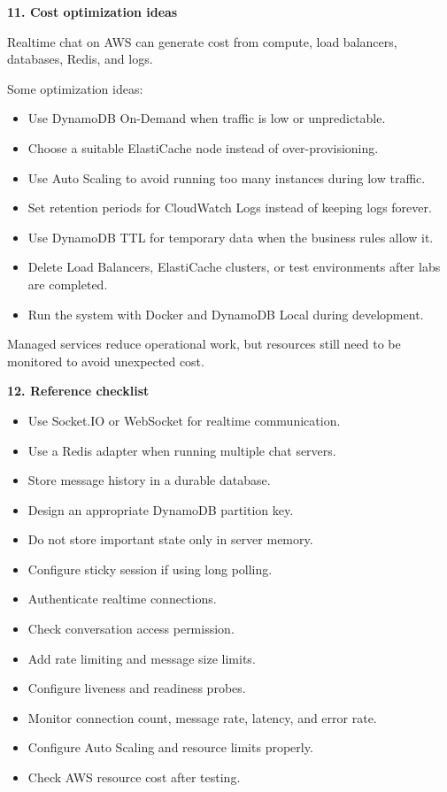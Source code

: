 \vspace{0.5em}\noindent\textbf{11. Cost optimization ideas}\par

Realtime chat on AWS can generate cost from compute, load balancers,
databases, Redis, and logs.

Some optimization ideas:

\begin{itemize}
\tightlist
\item
  Use DynamoDB On-Demand when traffic is low or unpredictable.
\item
  Choose a suitable ElastiCache node instead of over-provisioning.
\item
  Use Auto Scaling to avoid running too many instances during low
  traffic.
\item
  Set retention periods for CloudWatch Logs instead of keeping logs
  forever.
\item
  Use DynamoDB TTL for temporary data when the business rules allow it.
\item
  Delete Load Balancers, ElastiCache clusters, or test environments
  after labs are completed.
\item
  Run the system with Docker and DynamoDB Local during development.
\end{itemize}

Managed services reduce operational work, but resources still need to be
monitored to avoid unexpected cost.

\vspace{0.5em}\noindent\textbf{12. Reference checklist}\par

\begin{itemize}
\tightlist
\item
  Use Socket.IO or WebSocket for realtime communication.
\item
  Use a Redis adapter when running multiple chat servers.
\item
  Store message history in a durable database.
\item
  Design an appropriate DynamoDB partition key.
\item
  Do not store important state only in server memory.
\item
  Configure sticky session if using long polling.
\item
  Authenticate realtime connections.
\item
  Check conversation access permission.
\item
  Add rate limiting and message size limits.
\item
  Configure liveness and readiness probes.
\item
  Monitor connection count, message rate, latency, and error rate.
\item
  Configure Auto Scaling and resource limits properly.
\item
  Check AWS resource cost after testing.
\end{itemize}


